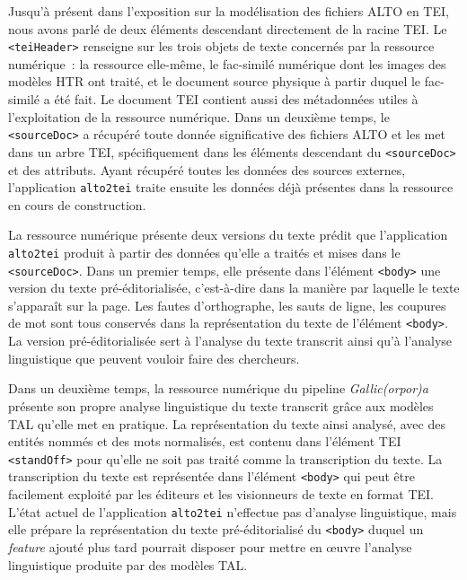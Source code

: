 \documentclass[class=article, crop=false]{standalone}
\begin{document}
Jusqu'à présent dans l'exposition sur la modélisation des fichiers \acrshort{ALTO} en \acrshort{TEI}, nous avons parlé de deux éléments descendant directement de la racine \acrshort{TEI}. Le \texttt{<teiHeader>} renseigne sur les trois objets de texte concernés par la ressource numérique~: la ressource elle-même, le fac-similé numérique dont les images des modèles \acrshort{HTR} ont traité, et le document source physique à partir duquel le fac-similé a été fait. Le document \acrshort{TEI} contient aussi des métadonnées utiles à l'exploitation de la ressource numérique. Dans un deuxième temps, le \texttt{<sourceDoc>} a récupéré toute donnée significative des fichiers \acrshort{ALTO} et les met dans un arbre \acrshort{TEI}, spécifiquement dans les éléments descendant du \texttt{<sourceDoc>} et des attributs. Ayant récupéré toutes les données des sources externes, l'application \texttt{alto2tei} traite ensuite les données déjà présentes dans la ressource en cours de construction.

La ressource numérique présente deux versions du texte prédit que l'application \texttt{alto2tei} produit à partir des données qu'elle a traités et mises dans le \texttt{<sourceDoc>}. Dans un premier temps, elle présente dans l'élément \texttt{<body>} une version du texte pré-éditorialisée, c'est-à-dire dans la manière par laquelle le texte s'apparaît sur la page. Les fautes d'orthographe, les sauts de ligne, les coupures de mot sont tous conservés dans la représentation du texte de l'élément \texttt{<body>}. La version pré-éditorialisée sert à l'analyse du texte transcrit ainsi qu'à l'analyse linguistique que peuvent vouloir faire des chercheurs. 

Dans un deuxième temps, la ressource numérique du pipeline \textit{Gallic(orpor)a} présente son propre analyse linguistique du texte transcrit grâce aux modèles \acrshort{TAL} qu'elle met en pratique. La représentation du texte ainsi analysé, avec des entités nommés et des mots normalisés, est contenu dans l'élément \acrshort{TEI} \texttt{<standOff>} pour qu'elle ne soit pas traité comme la transcription du texte. La transcription du texte est représentée dans l'élément \texttt{<body>} qui peut être facilement exploité par les éditeurs et les visionneurs de texte en format \acrshort{TEI}. L'état actuel de l'application \texttt{alto2tei} n'effectue pas d'analyse linguistique, mais elle prépare la représentation du texte pré-éditorialisé du \texttt{<body>} duquel un \textit{feature} ajouté plus tard pourrait disposer pour mettre en œuvre l'analyse linguistique produite par des modèles \acrshort{TAL}.
\end{document}

